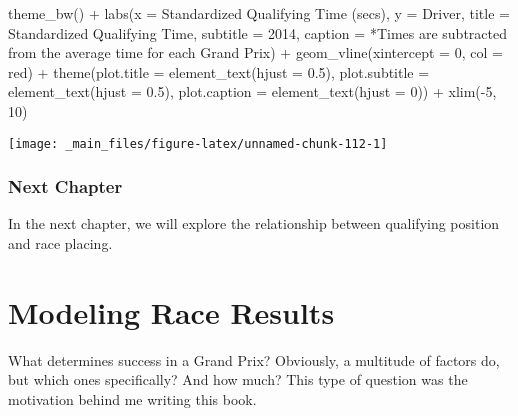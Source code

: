 \documentclass[
]{book}
\newenvironment{Shaded}{\begin{snugshade}}{\end{snugshade}}
\newcommand{\AttributeTok}[1]{\textcolor[rgb]{0.77,0.63,0.00}{#1}}
\newcommand{\DecValTok}[1]{\textcolor[rgb]{0.00,0.00,0.81}{#1}}
\newcommand{\FloatTok}[1]{\textcolor[rgb]{0.00,0.00,0.81}{#1}}
\newcommand{\FunctionTok}[1]{\textcolor[rgb]{0.00,0.00,0.00}{#1}}
\newcommand{\NormalTok}[1]{#1}
\newcommand{\SpecialCharTok}[1]{\textcolor[rgb]{0.00,0.00,0.00}{#1}}
\newcommand{\StringTok}[1]{\textcolor[rgb]{0.31,0.60,0.02}{#1}}
\begin{document}
\begin{Shaded}
\begin{Highlighting}[]
  \FunctionTok{theme\_bw}\NormalTok{() }\SpecialCharTok{+}
  \FunctionTok{labs}\NormalTok{(}\AttributeTok{x =} \StringTok{\textquotesingle{}Standardized Qualifying Time (secs)\textquotesingle{}}\NormalTok{,}
       \AttributeTok{y =} \StringTok{\textquotesingle{}Driver\textquotesingle{}}\NormalTok{,}
       \AttributeTok{title =} \StringTok{\textquotesingle{}Standardized Qualifying Time\textquotesingle{}}\NormalTok{,}
       \AttributeTok{subtitle =} \StringTok{\textquotesingle{}2014\textquotesingle{}}\NormalTok{,}
       \AttributeTok{caption =} \StringTok{\textquotesingle{}*Times are subtracted from the average time for each Grand Prix\textquotesingle{}}\NormalTok{) }\SpecialCharTok{+}
  \FunctionTok{geom\_vline}\NormalTok{(}\AttributeTok{xintercept =} \DecValTok{0}\NormalTok{, }\AttributeTok{col =} \StringTok{\textquotesingle{}red\textquotesingle{}}\NormalTok{) }\SpecialCharTok{+}
  \FunctionTok{theme}\NormalTok{(}\AttributeTok{plot.title =} \FunctionTok{element\_text}\NormalTok{(}\AttributeTok{hjust =} \FloatTok{0.5}\NormalTok{),}
        \AttributeTok{plot.subtitle =} \FunctionTok{element\_text}\NormalTok{(}\AttributeTok{hjust =} \FloatTok{0.5}\NormalTok{),}
        \AttributeTok{plot.caption =} \FunctionTok{element\_text}\NormalTok{(}\AttributeTok{hjust =} \DecValTok{0}\NormalTok{)) }\SpecialCharTok{+}
  \FunctionTok{xlim}\NormalTok{(}\SpecialCharTok{{-}}\DecValTok{5}\NormalTok{, }\DecValTok{10}\NormalTok{)}
\end{Highlighting}
\end{Shaded}

\begin{center}\texttt{[image: \_main\_files/figure-latex/unnamed-chunk-112-1]} \end{center}

\hypertarget{next-chapter-3}{%
\subsection{Next Chapter}\label{next-chapter-3}}

In the next chapter, we will explore the relationship between qualifying position and race placing.

\hypertarget{modeling-race-results}{%
\chapter{Modeling Race Results}\label{modeling-race-results}}

What determines success in a Grand Prix? Obviously, a multitude of factors do, but which ones specifically? And how much? This type of question was the motivation behind me writing this book.
\end{document}
